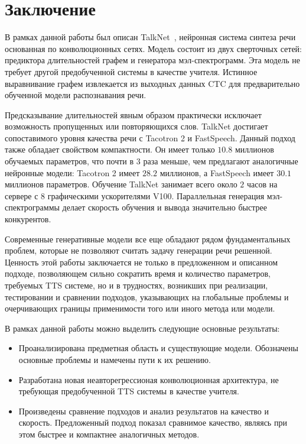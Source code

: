 \section*{Заключение}

В рамках данной работы был описан TalkNet~\cite{beliaev2020talknet}, нейронная система синтеза речи основанная по конволюционных сетях. Модель состоит из двух сверточных сетей: предиктора длительностей графем и генератора мэл-спектрограмм. Эта модель не требует другой предобученной системы в качестве учителя. Истинное выравнивание графем извлекается из выходных данных CTC для предварительно обученной модели распознавания речи.

Предсказывание длительностей явным образом практически исключает возможность пропущенных или повторяющихся слов. TalkNet достигает сопоставимого уровня качества речи с Tacotron 2 и FastSpeech. Данный подход также обладает свойством компактности. Он имеет только $10.8$ миллионов обучаемых параметров, что почти в 3 раза меньше, чем предлагают аналогичные нейронные модели: Tacotron 2 имеет $28.2$ миллионов, а FastSpeech имеет $30.1$ миллионов параметров. Обучение TalkNet занимает всего около $2$ часов на сервере с 8 графическими ускорителями V100. Параллельная генерация мэл-спектрограммы делает скорость обучения и вывода значительно быстрее конкурентов.

Современные генеративные модели все еще обладают рядом фундаментальных проблем, которые не позволяют считать задачу генерации речи решенной. Ценность этой работы заключается не только в предложенном и описанном подходе, позволяющем сильно сократить время и количество параметров, требуемых TTS системе, но и в трудностях, возникших при реализации, тестировании и сравнении подходов, указывающих на глобальные проблемы и очерчивающих границы применимости того или иного метода или модели.

В рамках данной работы можно выделить следующие основные результаты:
\begin{itemize}
    \item Проанализирована предметная область и существующие модели. Обозначены основные проблемы и намечены пути к их решению.
    \item Разработана новая неавторегрессионая конволюционная архитектура, не требующая предобученной TTS системы в качестве учителя.
    \item Произведены сравнение подходов и анализ результатов на качество и скорость. Предложенный подход показал сравнимое качество, являясь при этом быстрее и компактнее аналогичных методов.
\end{itemize}

